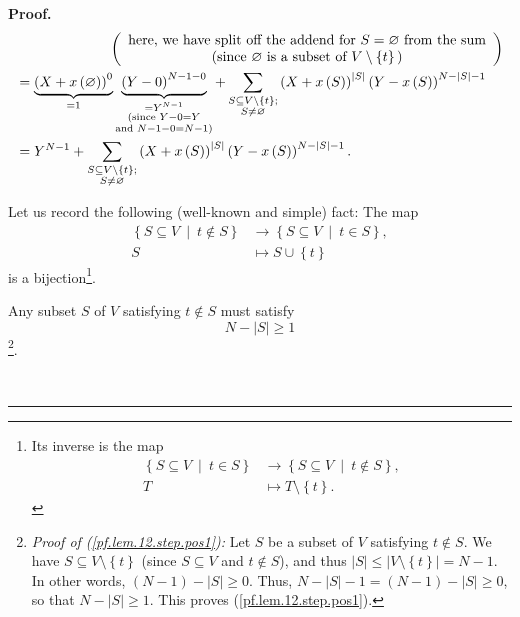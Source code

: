 \documentclass[numbers=enddot,12pt,final,onecolumn,notitlepage]{scrartcl}%
\theoremstyle{definition}
\newenvironment{proof}[1][Proof]{\noindent\textbf{#1.} }{\ \rule{0.5em}{0.5em}}
\let\sumnonlimits\sum
\renewcommand{\sum}{\sumnonlimits\limits}
\newenvironment{verlong}{}{}
\begin{document}
\begin{verlong}
\begin{proof}
\begin{align}
&  \ \ \ \ \ \ \ \ \ \ \ \ \ \ \ \ \ \ \ \ \left(
\begin{array}
[c]{c}%
\text{here, we have split off the addend for }S=\varnothing\text{ from the
sum}\\
\text{(since }\varnothing\text{ is a subset of }V\setminus\left\{  t\right\}
\text{)}%
\end{array}
\right) \nonumber\\
&  =\underbrace{\left(  X+x\left(  \varnothing\right)  \right)  ^{0}}%
_{=1}\underbrace{\left(  Y-0\right)  ^{N-1-0}}_{\substack{=Y^{N-1}%
\\\text{(since }Y-0=Y\\\text{and }N-1-0=N-1\text{)}}}+\sum
_{\substack{S\subseteq V\setminus\left\{  t\right\}  ;\\S\neq\varnothing
}}\left(  X+x\left(  S\right)  \right)  ^{\left\vert S\right\vert }\left(
Y-x\left(  S\right)  \right)  ^{N-\left\vert S\right\vert -1}\nonumber\\
&  =Y^{N-1}+\sum_{\substack{S\subseteq V\setminus\left\{  t\right\}
;\\S\neq\varnothing}}\left(  X+x\left(  S\right)  \right)  ^{\left\vert
S\right\vert }\left(  Y-x\left(  S\right)  \right)  ^{N-\left\vert
S\right\vert -1}. \label{pf.lem.12.step.ih1=1'b}%
\end{align}


Let us record the following (well-known and simple) fact: The map%
\begin{align}
\left\{  S\subseteq V\ \mid\ t\notin S\right\}   &  \rightarrow\left\{
S\subseteq V\ \mid\ t\in S\right\}  ,\nonumber\\
S  &  \mapsto S\cup\left\{  t\right\}  \label{pf.lem.12.step.bij}%
\end{align}
is a bijection\footnote{Its inverse is the map
\begin{align*}
\left\{  S\subseteq V\ \mid\ t\in S\right\}   &  \rightarrow\left\{
S\subseteq V\ \mid\ t\notin S\right\}  ,\\
T  &  \mapsto T\setminus\left\{  t\right\}  .
\end{align*}
}.

Any subset $S$ of $V$ satisfying $t\notin S$ must satisfy%
\begin{equation}
N-\left\vert S\right\vert \geq1 \label{pf.lem.12.step.pos1}%
\end{equation}
\footnote{\textit{Proof of (\ref{pf.lem.12.step.pos1}):} Let $S$ be a subset
of $V$ satisfying $t\notin S$. We have $S\subseteq V\setminus\left\{
t\right\}  $ (since $S\subseteq V$ and $t\notin S$), and thus $\left\vert
S\right\vert \leq\left\vert V\setminus\left\{  t\right\}  \right\vert =N-1$.
In other words, $\left(  N-1\right)  -\left\vert S\right\vert \geq0$. Thus,
$N-\left\vert S\right\vert -1=\left(  N-1\right)  -\left\vert S\right\vert
\geq0$, so that $N-\left\vert S\right\vert \geq1$. This proves
(\ref{pf.lem.12.step.pos1}).}.


\end{proof}
\end{verlong}
\end{document}
